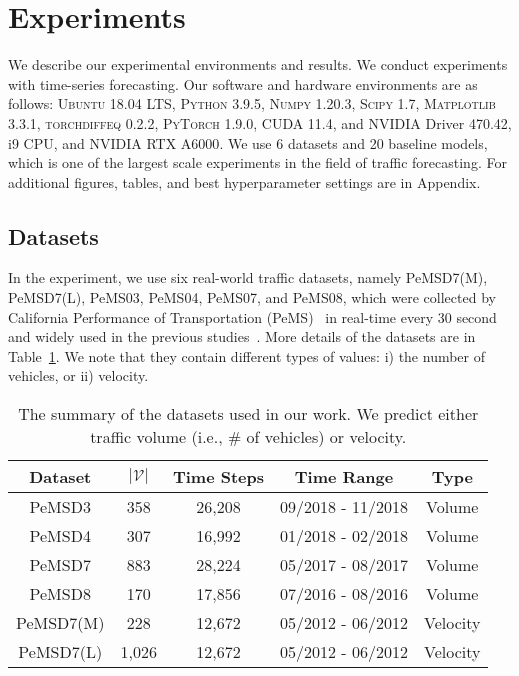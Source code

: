 \documentclass[letterpaper]{article} \usepackage{aaai22}  \usepackage{times}  \usepackage{helvet}  \usepackage{courier}  \usepackage[hyphens]{url}  \usepackage{graphicx} \urlstyle{rm} \def\UrlFont{\rm}  \usepackage{natbib}  \usepackage{caption} \DeclareCaptionStyle{ruled}{labelfont=normalfont,labelsep=colon,strut=off} \frenchspacing  \setlength{\pdfpagewidth}{8.5in}  \setlength{\pdfpageheight}{11in}  \usepackage{stfloats}
\begin{document}
\section{Experiments}
We describe our experimental environments and results. We conduct experiments with time-series forecasting. Our software and hardware environments are as follows: \textsc{Ubuntu} 18.04 LTS, \textsc{Python} 3.9.5, \textsc{Numpy} 1.20.3, \textsc{Scipy} 1.7, \textsc{Matplotlib} 3.3.1, \textsc{torchdiffeq} 0.2.2, \textsc{PyTorch} 1.9.0, \textsc{CUDA} 11.4, and \textsc{NVIDIA} Driver 470.42, i9 CPU, and \textsc{NVIDIA RTX A6000}. We use 6 datasets and 20 baseline models, which is one of the largest scale experiments in the field of traffic forecasting. For additional figures, tables, and best hyperparameter settings are in Appendix.
\subsection{Datasets}
In the experiment, we use six real-world traffic datasets, namely PeMSD7(M), PeMSD7(L), PeMS03, PeMS04, PeMS07, and PeMS08, which were collected by California Performance of Transportation (PeMS)~\cite{chen2001freeway} in real-time every 30 second and widely used in the previous studies~\cite{bing2018stgcn,guo2019astgcn,fang2021STODE,chen2021ZGCNET,song2020stsgcn}. More details of the datasets are in Table~\ref{tab:dataset}. We note that they contain different types of values: i) the number of vehicles, or ii) velocity.


\begin{table}[t]
\setlength{\tabcolsep}{2pt}
    \centering
    \small
    \begin{tabular}{ccccc}
    \hline
        Dataset     & $|\mathcal{V}|$  & Time Steps& Time Range & Type \\ \hline
        PeMSD3      & 358       & 26,208    & 09/2018 - 11/2018 & Volume \\
        PeMSD4      & 307       & 16,992    & 01/2018 - 02/2018 & Volume \\
        PeMSD7      & 883       & 28,224    & 05/2017 - 08/2017 & Volume \\ 
        PeMSD8      & 170       & 17,856    & 07/2016 - 08/2016 & Volume \\ 
        PeMSD7(M)   & 228       & 12,672    & 05/2012 - 06/2012 & Velocity\\
        PeMSD7(L)   & 1,026     & 12,672    & 05/2012 - 06/2012 & Velocity\\
    \hline
    \end{tabular}
    \caption{The summary of the datasets used in our work. We predict either traffic volume (i.e., \# of vehicles) or velocity.}
    \label{tab:dataset}
\end{table}
\end{document}
